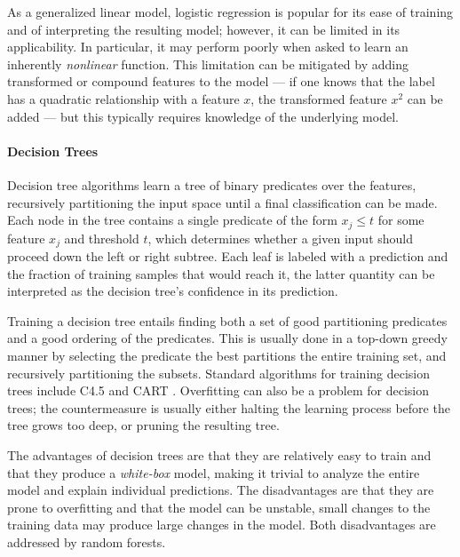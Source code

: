 As a generalized linear model, logistic regression is popular for its
ease of training and of interpreting the resulting model; however, it
can be limited in its applicability.
%
In particular, it may perform poorly when asked to learn an inherently
\emph{nonlinear} function.
%
This limitation can be mitigated by adding transformed or compound
features to the model --- \eg if one knows that the label has a
quadratic relationship with a feature $x$, the transformed feature $x^2$
can be added --- but this typically requires knowledge of the underlying
model.


\paragraph{Decision Trees}
Decision tree algorithms learn a tree of binary predicates over the
features, recursively partitioning the input space until a final
classification can be made.
%
Each node in the tree contains a single predicate of the form
$x_j \leq t$ for some feature $x_j$ and threshold $t$, which determines
whether a given input should proceed down the left or right subtree.
%
Each leaf is labeled with a prediction and the fraction of training
samples that would reach it, the latter quantity can be interpreted as
the decision tree's confidence in its prediction.

Training a decision tree entails finding both a set of good partitioning
predicates and a good ordering of the predicates.
%
This is usually done in a top-down greedy manner by selecting the
predicate the best partitions the entire training set, and recursively
partitioning the subsets.
%
Standard algorithms for training decision trees include C4.5
\citep{Quinlan1993-de} and CART \citep{Breiman1984-qy}.
%
Overfitting can also be a problem for decision trees; the countermeasure
is usually either halting the learning process before the tree grows too
deep, or pruning the resulting tree.

The advantages of decision trees are that they are relatively easy to
train and that they produce a \emph{white-box} model, making it trivial
to analyze the entire model and explain individual predictions.
%
The disadvantages are that they are prone to overfitting and that the
model can be unstable, \ie small changes to the training data may
produce large changes in the model.
%
Both disadvantages are addressed by random forests.

